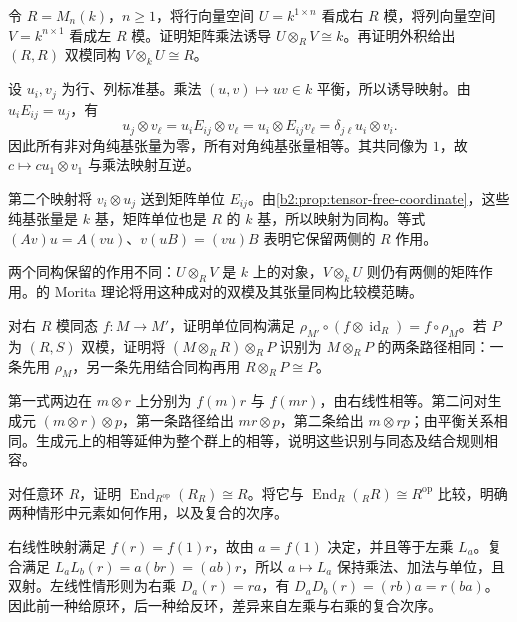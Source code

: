 \begin{exercise}\label{b2:ex:06-matrix-bimodule}
	令 \(R=M_n(k)\)，\(n\ge1\)，将行向量空间 \(U=k^{1\times n}\) 看成右 \(R\) 模，将列向量空间 \(V=k^{n\times1}\) 看成左 \(R\) 模。证明矩阵乘法诱导 \(U\otimes_RV\cong k\)。再证明外积给出 \((R,R)\) 双模同构 \(V\otimes_kU\cong R\)。
\end{exercise}
\begin{solution}
	设 \(u_i,v_j\) 为行、列标准基。乘法 \((u,v)\mapsto uv\in k\) 平衡，所以诱导映射。由 \(u_iE_{ij}=u_j\)，有
	\[
		u_j\otimes v_\ell=u_iE_{ij}\otimes v_\ell =u_i\otimes E_{ij}v_\ell=\delta_{j\ell}u_i\otimes v_i.
	\]
	因此所有非对角纯基张量为零，所有对角纯基张量相等。其共同像为 \(1\)，故 \(c\mapsto c u_1\otimes v_1\) 与乘法映射互逆。

	第二个映射将 \(v_i\otimes u_j\) 送到矩阵单位 \(E_{ij}\)。由\cref{b2:prop:tensor-free-coordinate}，这些纯基张量是 \(k\) 基，矩阵单位也是 \(R\) 的 \(k\) 基，所以映射为同构。等式 \((Av)u=A(vu)\)、\(v(uB)=(vu)B\) 表明它保留两侧的 \(R\) 作用。

	两个同构保留的作用不同：\(U\otimes_RV\) 是 \(k\) 上的对象，\(V\otimes_kU\) 则仍有两侧的矩阵作用。的 Morita 理论将用这种成对的双模及其张量同构比较模范畴。
\end{solution}

\begin{exercise}\label{b2:ex:06-unit-naturality}
	对右 \(R\) 模同态 \(f:M\to M'\)，证明单位同构满足 \(\rho_{M'}\circ(f\otimes\operatorname{id}_R)=f\circ\rho_M\)。若 \(P\) 为 \((R,S)\) 双模，证明将 \((M\otimes_RR)\otimes_RP\) 识别为 \(M\otimes_RP\) 的两条路径相同：一条先用 \(\rho_M\)，另一条先用结合同构再用 \(R\otimes_RP\cong P\)。
\end{exercise}
\begin{solution}
	第一式两边在 \(m\otimes r\) 上分别为 \(f(m)r\) 与 \(f(mr)\)，由右线性相等。第二问对生成元 \((m\otimes r)\otimes p\)，第一条路径给出 \(mr\otimes p\)，第二条给出 \(m\otimes rp\)；由平衡关系相同。生成元上的相等延伸为整个群上的相等，说明这些识别与同态及结合规则相容。
\end{solution}

\begin{exercise}\label{b2:ex:06-opposite-ring}
	对任意环 \(R\)，证明 \(\operatorname{End}_{R^{\mathrm{op}}}(R_R)\cong R\)。将它与 \(\operatorname{End}_R({}_RR)\cong R^{\mathrm{op}}\) 比较，明确两种情形中元素如何作用，以及复合的次序。
\end{exercise}
\begin{solution}
	右线性映射满足 \(f(r)=f(1)r\)，故由 \(a=f(1)\) 决定，并且等于左乘 \(L_a\)。复合满足 \(L_aL_b(r)=a(br)=(ab)r\)，所以 \(a\mapsto L_a\) 保持乘法、加法与单位，且双射。左线性情形则为右乘 \(D_a(r)=ra\)，有 \(D_aD_b(r)=(rb)a=r(ba)\)。因此前一种给原环，后一种给反环，差异来自左乘与右乘的复合次序。
\end{solution}

